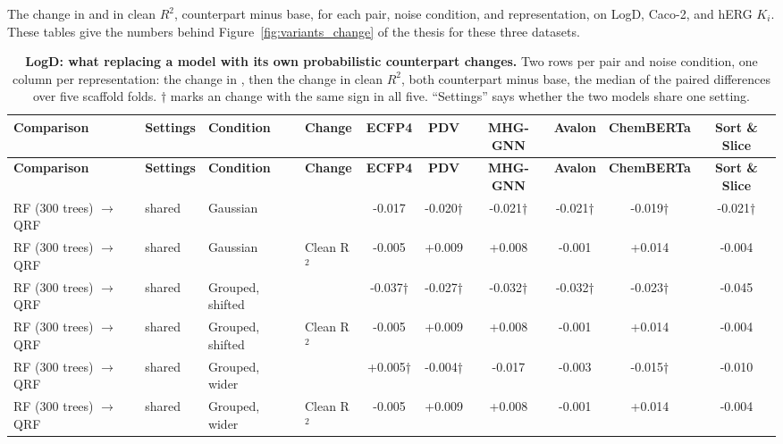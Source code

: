 \clearpage
\begin{landscape}
\label{app:noise:sec:rf_vs_qrf_assay}
The change in \aucnorm{} and in clean $R^2$, counterpart minus base, for each pair, noise condition, and representation, on LogD, Caco-2, and hERG $K_i$. These tables give the numbers behind Figure~\ref{fig:variants_change} of the thesis for these three datasets.
{\AFtablefont
\begin{longtable}{llllcccccc}
\caption{\textbf{LogD: what replacing a model with its own probabilistic counterpart changes.}
Two rows per pair and noise condition, one column per representation: the change in \aucnorm{}, then the change in clean $R^2$, both counterpart minus base, the median of the paired differences over five scaffold folds. $\dagger$ marks an \aucnorm{} change with the same sign in all five. ``Settings'' says whether the two models share one setting.}
\label{app:noise:counterparts_logd}\\
\toprule
\textbf{Comparison} & \textbf{Settings} & \textbf{Condition} & \textbf{Change} & \textbf{ECFP4} & \textbf{PDV} & \textbf{MHG-GNN} & \textbf{Avalon} & \textbf{ChemBERTa} & \textbf{Sort \& Slice} \\
\midrule
\endfirsthead
\toprule
\textbf{Comparison} & \textbf{Settings} & \textbf{Condition} & \textbf{Change} & \textbf{ECFP4} & \textbf{PDV} & \textbf{MHG-GNN} & \textbf{Avalon} & \textbf{ChemBERTa} & \textbf{Sort \& Slice} \\
\midrule
\endhead
RF (300 trees) $\rightarrow$ QRF & shared & Gaussian & \aucnorm{} & -0.017 & -0.020† & -0.021† & -0.021† & -0.019† & -0.021† \\
RF (300 trees) $\rightarrow$ QRF & shared & Gaussian & Clean R$^2$ & -0.005 & +0.009 & +0.008 & -0.001 & +0.014 & -0.004 \\
RF (300 trees) $\rightarrow$ QRF & shared & Grouped, shifted & \aucnorm{} & -0.037† & -0.027† & -0.032† & -0.032† & -0.023† & -0.045 \\
RF (300 trees) $\rightarrow$ QRF & shared & Grouped, shifted & Clean R$^2$ & -0.005 & +0.009 & +0.008 & -0.001 & +0.014 & -0.004 \\
RF (300 trees) $\rightarrow$ QRF & shared & Grouped, wider & \aucnorm{} & +0.005† & -0.004† & -0.017 & -0.003 & -0.015† & -0.010 \\
RF (300 trees) $\rightarrow$ QRF & shared & Grouped, wider & Clean R$^2$ & -0.005 & +0.009 & +0.008 & -0.001 & +0.014 & -0.004 \\

\end{longtable}}
\end{landscape}
